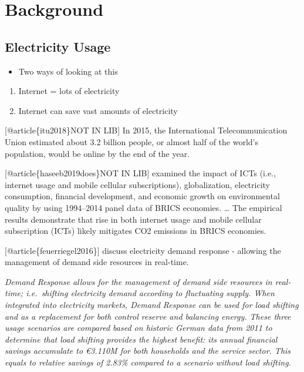\documentclass[11pt]{article}
\providecommand{\tightlist}{%
      \setlength{\itemsep}{0pt}\setlength{\parskip}{0pt}}
\begin{document}
    \hypertarget{background}{%
\section{Background}\label{background}}

    \hypertarget{electricity-usage}{%
\subsection{Electricity Usage}\label{electricity-usage}}

    \begin{itemize}
\tightlist
\item
  Two ways of looking at this
\end{itemize}

\begin{enumerate}
\def\labelenumi{\arabic{enumi}.}
\tightlist
\item
  Internet = lots of electricity
\item
  Internet can save vast amounts of electricity
\end{enumerate}

{[}@article\{itu2018\}NOT IN LIB{]} In 2015, the International
Telecommunication Union estimated about 3.2 billion people, or almost
half of the world's population, would be online by the end of the year.

{[}@article\{haseeb2019does\}NOT IN LIB{]} examined the impact of ICTs
(i.e., internet usage and mobile cellular subscriptions), globalization,
electricity consumption, financial development, and economic growth on
environmental quality by using 1994--2014 panel data of BRICS economies.
\ldots{} The empirical results demonstrate that rise in both internet
usage and mobile cellular subscription (ICTs) likely mitigates CO2
emissions in BRICS economies.

{[}@article\{feuerriegel2016\}{]} discuss electricity demand response -
allowing the management of demand side resources in real-time.

\emph{Demand Response allows for the management of demand side resources
in real-time; i.e.~shifting electricity demand according to fluctuating
supply. When integrated into electricity markets, Demand Response can be
used for load shifting and as a replacement for both control reserve and
balancing energy. These three usage scenarios are compared based on
historic German data from 2011 to determine that load shifting provides
the highest benefit: its annual financial savings accumulate to €3.110M
for both households and the service sector. This equals to relative
savings of 2.83\% compared to a scenario without load shifting.}
\end{document}

